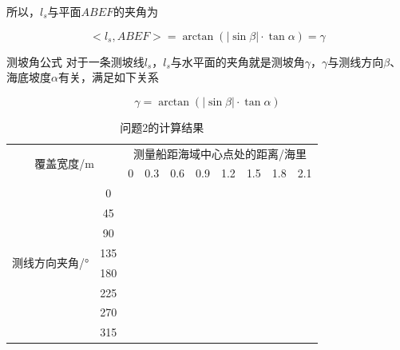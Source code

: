 所以，$l_s$与平面$ABEF$的夹角为

\begin{equation}
    <l_s, ABEF> 
    = \arctan \left(|\sin \beta| \cdot  \tan \alpha\right)
    = \gamma
\end{equation}

\begin{mcmTheorem}{测坡角公式}
    \label{theorem:测坡角公式}
    对于一条测坡线$l_s$，$l_s$与水平面的夹角就是测坡角$\gamma$，$\gamma$与测线方向$\beta$、海底坡度$\alpha$有关，满足如下关系

    \begin{equation}
        \gamma = \arctan(|\sin\beta| \cdot \tan\alpha)
    \end{equation}
\end{mcmTheorem}

\begin{table}[h]
    \centering
    \caption{问题2的计算结果}
    \begin{tabular}{cccccccccc}
    \hline
    \multicolumn{2}{c}{\multirow{2}{*}{覆盖宽度/m}} & \multicolumn{8}{c}{测量船距海域中心点处的距离/海里}        \\ \cline{3-10} 
    \multicolumn{2}{c}{}                        & 0 & 0.3 & 0.6 & 0.9 & 1.2 & 1.5 & 1.8 & 2.1 \\ \hline
    \multirow{8}{*}{测线方向夹角/°}       & 0         &   &     &     &     &     &     &     &     \\
                                    & 45        &   &     &     &     &     &     &     &     \\
                                    & 90        &   &     &     &     &     &     &     &     \\
                                    & 135       &   &     &     &     &     &     &     &     \\
                                    & 180       &   &     &     &     &     &     &     &     \\
                                    & 225       &   &     &     &     &     &     &     &     \\
                                    & 270       &   &     &     &     &     &     &     &     \\
                                    & 315       &   &     &     &     &     &     &     &     \\ \hline
    \end{tabular}
\end{table}

